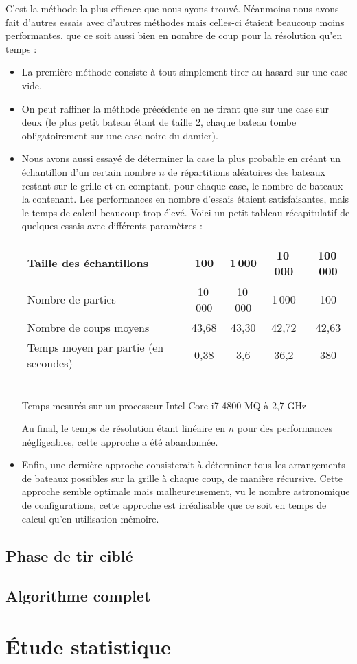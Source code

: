 C'est la méthode la plus efficace que nous ayons trouvé. Néanmoins nous avons fait d'autres essais avec d'autres méthodes mais celles-ci étaient beaucoup moins performantes, que ce soit aussi bien en nombre de coup pour la résolution qu'en temps :
\begin{itemize}
\item La première méthode consiste à tout simplement tirer au hasard sur une case vide.
\item On peut raffiner la méthode précédente en ne tirant que sur une case sur deux (le plus petit bateau étant de taille 2, chaque bateau tombe obligatoirement sur une case noire du damier).
\item Nous avons aussi essayé de déterminer la case la plus probable en créant un échantillon d'un certain nombre $n$ de répartitions aléatoires des bateaux restant sur le grille et en comptant, pour chaque case, le nombre de bateaux la contenant. Les performances en nombre d'essais étaient satisfaisantes, mais le temps de calcul beaucoup trop élevé. Voici un petit tableau récapitulatif de quelques essais avec différents paramètres :

\begin{center}
\begin{tabular}{|l|c|c|c|c|}
\hline
Taille des échantillons & 100 & 1\,000 & 10\,000 & 100\,000\\
\hline
Nombre de parties & 10\,000 & 10\,000 & 1\,000 & 100\\
\hline
Nombre de coups moyens & 43,68 & 43,30 & 42,72 & 42,63\\
\hline
Temps moyen par partie (en secondes) & 0,38 & 3,6 & 36,2 & 380\\
\hline 
\end{tabular}\\
Temps mesurés sur un processeur Intel Core i7 4800-MQ à 2,7 GHz
\end{center}

Au final, le temps de résolution étant linéaire en $n$ pour des performances négligeables, cette approche a été abandonnée.

\item Enfin, une dernière approche consisterait à déterminer tous les arrangements de bateaux possibles sur la grille à chaque coup, de manière récursive. Cette approche semble optimale mais malheureusement, vu le nombre astronomique de configurations, cette approche est irréalisable que ce soit en temps de calcul qu'en utilisation mémoire. 

\end{itemize}  

\subsection{Phase de tir ciblé}

\subsection{Algorithme complet}

\section{Étude statistique}
 